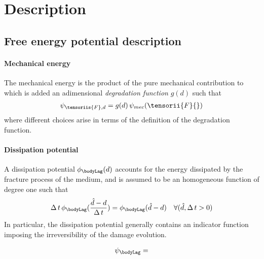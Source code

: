 \section{Description}

\subsection{Free energy potential description}

\paragraph{Mechanical energy}

The mechanical energy is the product of the pure mechanical contribution to which is added
an adimensional \textit{degradation function} $g(d)$ such that
%
%
%
\begin{equation}
    \begin{aligned}
        \psi_{\tensoriis{F}, d} = g(d) \, \psi_{mec}(\tensorii{F}{})
    \end{aligned}
\end{equation}
%
%
%
where different choices arise in terms of the definition of the degradation function.

\paragraph{Dissipation potential}

A dissipation potential $\phi_{\bodyLag}(d)$ accounts for the energy dissipated by the fracture process of the medium, and is assumed to be
an homogeneous function of degree one such that
%
%
%
\begin{equation}
    \begin{aligned}
        \Delta \, t \, \phi_{\bodyLag}(\frac{\hat{d} - d} {\Delta \, t}) = \phi_{\bodyLag}(\hat{d} - d)
        &&
        \forall (\hat{d}, \Delta \, t > 0)
    \end{aligned}
\end{equation}
%
%
%
In particular, the dissipation potential generally contains an indicator function imposing the irreversibility of the
damage evolution.

\begin{equation}
    \begin{aligned}
        \psi_{\bodyLag} = 
    \end{aligned}
\end{equation}